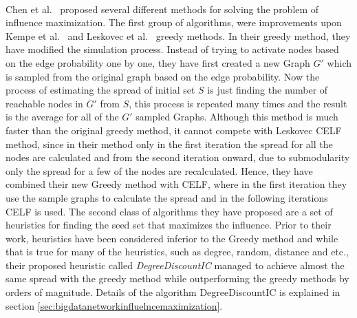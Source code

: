 \documentclass[english]{tktltiki}
\begin{document}
\\Chen et al.\ \cite{chen09} proposed several different methods for solving the problem of influence maximization. The first group of algorithms, were improvements upon Kempe et al.\ \cite{kempe03} and Leskovec et al.\ \cite{leskovec07} greedy methods. In their greedy method, they have modified the simulation process. Instead of trying to activate nodes based on the edge probability one by one, they have first created a new Graph $G'$ which is sampled from the original graph based on the edge probability. Now the process of estimating the spread of initial set $S$ is just finding the number of reachable nodes in $G'$ from $S$, this process is repeated many times and the result is the average for all of the $G'$ sampled Graphs. Although this method is much faster than the original greedy method, it cannot compete with Leskovec \cite{leskovec07} CELF method, since in their method only in the first iteration the spread for all the nodes are calculated and from the second iteration onward, due to submodularity only the spread for a few of the nodes are recalculated. Hence, they have combined their new Greedy method with CELF, where in the first iteration they use the sample graphs to calculate the spread and in the following iterations CELF is used. The second class of algorithms they have proposed are a set of heuristics for finding the seed set that maximizes the influence. Prior to their work, heuristics have been considered inferior to the Greedy method and while that is true for many of the heuristics, such as degree, random, distance and etc., their proposed heuristic called \textit{DegreeDiscountIC} managed to achieve almost the same spread with the greedy method while outperforming the greedy methods by orders of magnitude. Details of the algorithm DegreeDiscountIC is explained in section \ref{sec:bigdatanetworkinfluelncemaximization}.
\end{document}
